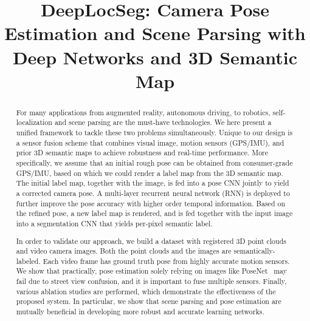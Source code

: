 \documentclass[10pt,twocolumn,letterpaper]{article}
\makeatletter
\DeclareRobustCommand\onedot{\futurelet\@let@token\@onedot}
\def\onedot{\ifx\@let@token.\else.\null\fi\xspace}
\def\eg{\emph{e.g.}}
\def\etc{\emph{etc}\onedot}
\makeatother
\begin{document}
\title{DeepLocSeg: Camera Pose Estimation and Scene Parsing with Deep Networks and 3D Semantic Map}

\maketitle

\begin{abstract}

For many applications from augmented reality, autonomous driving, to robotics, self-localization and scene parsing are the must-have technologies. We here present a unified framework to tackle these two problems simultaneously. Unique to our design is a sensor fusion scheme that combines visual image, motion sensors (GPS/IMU), and prior 3D semantic maps to achieve robustness and real-time performance. More specifically, we assume that an initial rough pose can be obtained from consumer-grade GPS/IMU, based on which we could render a label map from the 3D semantic map. The initial label map, together with the image, is fed into a pose CNN jointly to yield a corrected camera pose.
A multi-layer recurrent neural network (RNN) is deployed to further improve the pose accuracy with higher order temporal information.
Based on the refined pose, a new label map is rendered, and is fed together with the input image into a segmentation CNN that yields per-pixel semantic label.

In order to validate our approach, we build a dataset with registered 3D point clouds and video camera images. Both the point clouds and the images are semantically-labeled. Each video frame has ground truth pose from highly accurate motion sensors.
We show that practically, pose estimation solely relying on images like PoseNet~\cite{Kendall_2015_ICCV} may fail due to street view confusion, and it is important to fuse multiple sensors. Finally, various ablation studies are performed, which demonstrate the effectiveness of the proposed system. In particular, we show that scene parsing and pose estimation are mutually beneficial in developing more robust and accurate learning networks.


\end{abstract}
\end{document}
